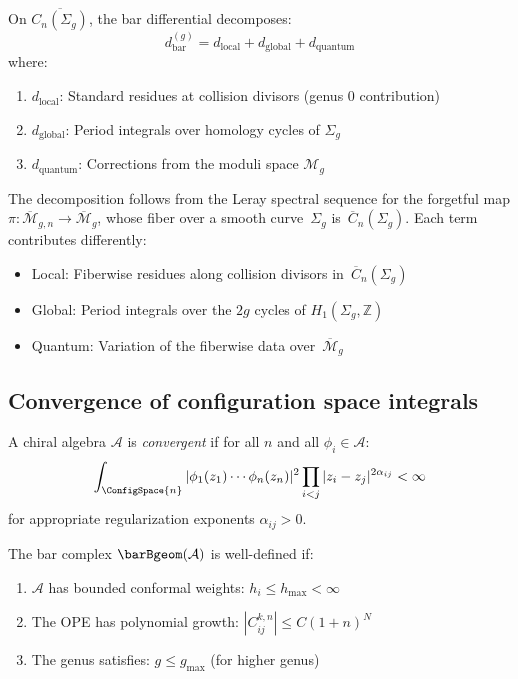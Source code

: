 \begin{remark}
\label{thm:period-integrals-bar}
On $\overline{C_n(\Sigma_g)}$, the bar differential decomposes:
\[
d_{\text{bar}}^{(g)} = d_{\text{local}} + d_{\text{global}} + d_{\text{quantum}}
\]
where:
\begin{enumerate}
\item $d_{\text{local}}$: Standard residues at collision divisors (genus 0 contribution)
\item $d_{\text{global}}$: Period integrals over homology cycles of $\Sigma_g$
\item $d_{\text{quantum}}$: Corrections from the moduli space $\mathcal{M}_g$
\end{enumerate}
The decomposition follows from the Leray spectral sequence for the forgetful map
$\pi\colon \overline{\mathcal{M}}_{g,n} \to \overline{\mathcal{M}}_g$,
whose fiber over a smooth curve~$\Sigma_g$ is~$\overline{C}_n(\Sigma_g)$.
Each term contributes differently:
\begin{itemize}
\item Local: Fiberwise residues along collision divisors in~$\overline{C}_n(\Sigma_g)$
\item Global: Period integrals over the $2g$ cycles of $H_1(\Sigma_g, \mathbb{Z})$
\item Quantum: Variation of the fiberwise data over~$\overline{\mathcal{M}}_g$
\end{itemize}
\end{remark}

\subsection{Convergence of configuration space integrals}

\begin{definition}
A chiral algebra $\mathcal{A}$ is \emph{convergent} if for all $n$ and all $\phi_i \in \mathcal{A}$:
\[\int_{\ConfigSpace{n}} |\phi_1(z_1) \cdots \phi_n(z_n)|^2 \prod_{i<j} |z_i - z_j|^{2\alpha_{ij}} < \infty\]
for appropriate regularization exponents $\alpha_{ij} > 0$.
\end{definition}

\begin{theorem}\label{thm:FM-convergence}
The bar complex $\barBgeom(\mathcal{A})$ is well-defined if:
\begin{enumerate}
\item $\mathcal{A}$ has bounded conformal weights: $h_i \leq h_{\max} < \infty$
\item The OPE has polynomial growth: $|C_{ij}^{k,n}| \leq C(1 + n)^N$
\item The genus satisfies: $g \leq g_{\max}$ (for higher genus)
\end{enumerate}
\end{theorem}

